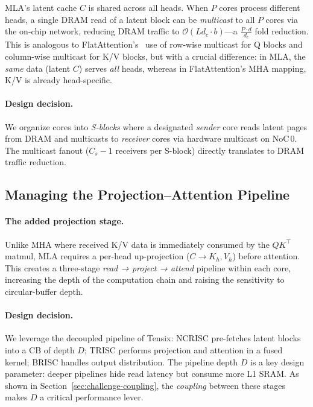 \documentclass[sigconf, review, anonymous]{acmart}
\newcommand{\SblockName}{S-block}
\newcommand{\SblockNames}{S-blocks}
\begin{document}
MLA's latent cache $C$ is shared across all heads.  When $P$ cores
process different heads, a single DRAM read of a latent block can be
\emph{multicast} to all $P$ cores via the on-chip network, reducing
DRAM traffic to $\mathcal{O}(L d_c \cdot b)$---a
$\frac{P \cdot d}{d_c}$ fold reduction.  This is analogous to
FlatAttention's~\cite{flatattention2024} use of row-wise multicast for
Q blocks and column-wise multicast for K/V blocks, but with a crucial
difference: in MLA, the \emph{same} data (latent $C$) serves
\emph{all} heads, whereas in FlatAttention's MHA mapping, K/V is
already head-specific.

\paragraph{Design decision.}
We organize cores into \emph{\SblockNames} where a designated
\emph{sender} core reads latent pages from DRAM and multicasts to
\emph{receiver} cores via hardware multicast on NoC\,0.  The multicast
fanout ($C_s - 1$ receivers per \SblockName) directly translates to DRAM
traffic reduction.



\subsection{Managing the Projection--Attention Pipeline}\label{sec:concept-pipeline}


\paragraph{The added projection stage.}
Unlike MHA where received K/V data is immediately consumed by the
$QK^\top$ matmul, MLA requires a per-head up-projection
($C \rightarrow K_h, V_h$) before attention.  This creates a
three-stage \emph{read → project → attend} pipeline within each core,
increasing the depth of the computation chain and raising the
sensitivity to circular-buffer depth.

\paragraph{Design decision.}
We leverage the decoupled pipeline of Tensix: NCRISC pre-fetches
latent blocks into a CB of depth $D$; TRISC performs projection and
attention in a fused kernel; BRISC handles output distribution.  The
pipeline depth $D$ is a key design parameter: deeper pipelines hide
read latency but consume more L1 SRAM.  As shown in
Section~\ref{sec:challenge-coupling}, the \emph{coupling} between
these stages makes $D$ a critical performance lever.
\end{document}
